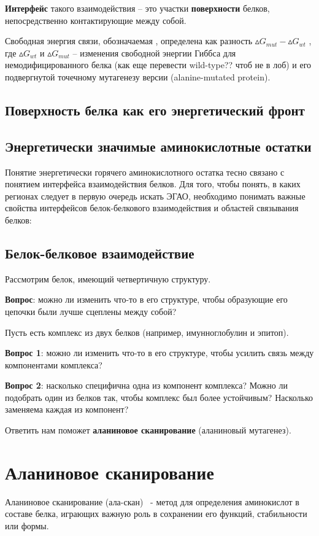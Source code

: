 \textbf{Интерфейс} такого взаимодействия -- это участки \textbf{поверхности} белков, непосредственно контактирующие между собой.

Свободная энергия связи, обозначаемая \ddG, определена как разность $\vartriangle\!G_{mut} - \vartriangle\!G_{wt}$ , где $\vartriangle\!G_{wt}$ и $\vartriangle\!G_{mut}$ -- изменения свободной энергии Гиббса для немодифицированного белка (как еще перевести wild-type?? чтоб не в лоб) и его подвергнутой точечному мутагенезу версии (alanine-mutated
protein).
\subsection{Поверхность белка как его энергетический фронт}
\subsection{Энергетически значимые аминокислотные остатки}
Понятие энергетически горячего аминокислотного остатка тесно связано с понятием интерфейса взаимодействия белков. Для того, чтобы понять, в каких регионах следует в первую очередь искать ЭГАО, необходимо понимать важные свойства интерфейсов белок-белкового взаимодействия и областей связывания белков:
\subsection{Белок-белковое взаимодействие}

Рассмотрим белок, имеющий четвертичную структуру.

\textbf{Вопрос}: можно ли изменить что-то в его структуре, чтобы образующие его цепочки были лучше сцеплены между собой?

Пусть есть комплекс из двух белков (например, имунноглобулин и эпитоп).

\textbf{Вопрос 1}: можно ли изменить что-то в его структуре, чтобы усилить связь между компонентами комплекса?

\textbf{Вопрос 2}: насколько специфична одна из компонент комплекса?  Можно ли подобрать один из белков так, чтобы комплекс был более устойчивым? Насколько заменяема каждая из компонент?

Ответить нам поможет \textbf{аланиновое сканирование} (аланиновый мутагенез).
\newpage
\section{Аланиновое сканирование}
Аланиновое сканирование (ала-скан)~\cite{alascan2001} - метод для определения аминокислот в составе белка, играющих важную роль в сохранении его функций, стабильности или формы.

